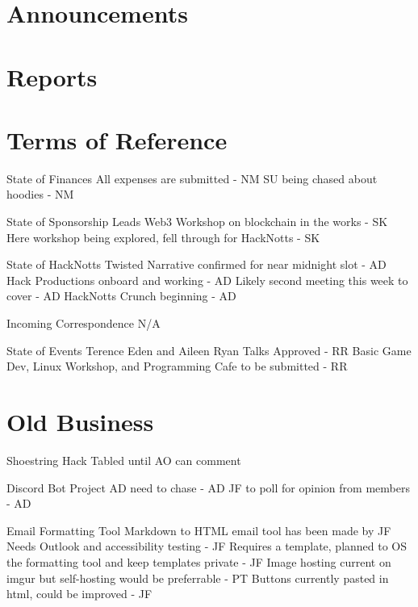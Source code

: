 \documentclass[11pt,hacksoc]{meetingmins}
\begin{document}
\maketitle

\section{Announcements}

\section{Reports}

\section{Terms of Reference}
\begin{items}
\item {State of Finances}
\subitem All expenses are submitted - NM
\subitem SU being chased about hoodies - NM
\item {State of Sponsorship Leads}
\subitem Web3 Workshop on blockchain in the works - SK
\subitem Here workshop being explored, fell through for HackNotts - SK
\item {State of HackNotts}
\subitem Twisted Narrative confirmed for near midnight slot - AD
\subitem Hack Productions onboard and working - AD
\subitem Likely second meeting this week to cover - AD
\subitem HackNotts Crunch beginning - AD
\item {Incoming Correspondence}
\subitem N/A
\item {State of Events}
\subitem Terence Eden and Aileen Ryan Talks Approved - RR
\subitem Basic Game Dev, Linux Workshop, and Programming Cafe to be submitted - RR

\end{items}

\section{Old Business}
\begin{items}
\item Shoestring Hack
\subitem Tabled until AO can comment
\item Discord Bot Project
\subitem AD need to chase - AD
\subitem JF to poll for opinion from members - AD
\item Email Formatting Tool
\subitem Markdown to HTML email tool has been made by JF
\subitem Needs Outlook and accessibility testing - JF
\subitem Requires a template, planned to OS the formatting tool and keep templates private - JF
\subitem Image hosting current on imgur but self-hosting would be preferrable - PT
\subitem Buttons currently pasted in html, could be improved - JF
\end{items}
\end{document}
